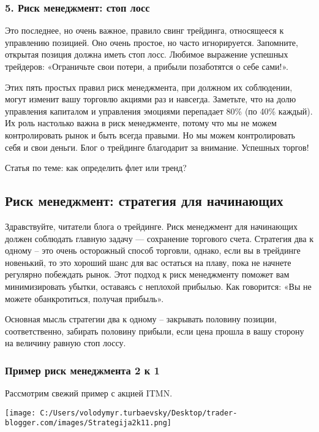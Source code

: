 \documentclass[a5paper]{article}
\begin{document}
\subsubsection{5. Риск менеджмент: стоп лосс}

Это последнее, но очень важное, правило свинг трейдинга, относящееся к управлению позицией. Оно очень простое, но часто игнорируется. Запомните, открытая позиция должна иметь стоп лосс. Любимое выражение успешных трейдеров: «Ограничьте свои потери, а прибыли позаботятся о себе сами!».

Этих пять простых правил риск менеджмента, при должном их соблюдении, могут изменит вашу торговлю акциями раз и навсегда. Заметьте, что на долю управления капиталом и управления эмоциями перепадает 80\% (по 40\% каждый). Их роль настолько важна в риск менеджменте, потому что мы не можем контролировать рынок и быть всегда правыми. Но мы можем контролировать себя и свои деньги. Блог о трейдинге благодарит за внимание. Успешных торгов!


Статья по теме: как определить флет или тренд?

\subsection{Риск менеджмент: стратегия для начинающих}

Здравствуйте, читатели блога о трейдинге. Риск менеджмент для начинающих должен соблюдать главную задачу — сохранение торгового счета. Стратегия два к одному – это очень осторожный способ торговли, однако, если вы в трейдинге новенький, то это хороший шанс для вас остаться на плаву, пока не начнете регулярно побеждать рынок. Этот подход к риск менеджменту поможет вам минимизировать убытки, оставаясь с неплохой прибылью. Как говорится: «Вы не можете обанкротиться, получая прибыль».

Основная мысль стратегии два к одному – закрывать половину позиции,
соответственно, забирать половину прибыли, если цена прошла в вашу
сторону на величину равную стоп лоссу.

\subsubsection{Пример риск менеджмента 2 к 1}

Рассмотрим свежий пример с акцией ITMN.

\texttt{[image: C:/Users/volodymyr.turbaevsky/Desktop/trader-blogger.com/images/Strategija2k11.png]}
\end{document}
